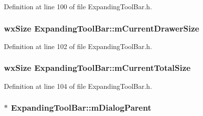 Definition at line 100 of file Expanding\+Tool\+Bar.\+h.

\subsubsection[{\texorpdfstring{m\+Current\+Drawer\+Size}{mCurrentDrawerSize}}]{\setlength{\rightskip}{0pt plus 5cm}wx\+Size Expanding\+Tool\+Bar\+::m\+Current\+Drawer\+Size\hspace{0.3cm}{\ttfamily [protected]}}\hypertarget{class_expanding_tool_bar_afc634ddc6db5c9e793250f45e8367ce4}{}\label{class_expanding_tool_bar_afc634ddc6db5c9e793250f45e8367ce4}


Definition at line 102 of file Expanding\+Tool\+Bar.\+h.

\subsubsection[{\texorpdfstring{m\+Current\+Total\+Size}{mCurrentTotalSize}}]{\setlength{\rightskip}{0pt plus 5cm}wx\+Size Expanding\+Tool\+Bar\+::m\+Current\+Total\+Size\hspace{0.3cm}{\ttfamily [protected]}}\hypertarget{class_expanding_tool_bar_af3ea6ec61447606102b1cfdc972b1c82}{}\label{class_expanding_tool_bar_af3ea6ec61447606102b1cfdc972b1c82}


Definition at line 104 of file Expanding\+Tool\+Bar.\+h.

\subsubsection[{\texorpdfstring{m\+Dialog\+Parent}{mDialogParent}}]{$\ast$ Expanding\+Tool\+Bar\+::m\+Dialog\+Parent\hspace{0.3cm}{\ttfamily [protected]}}\hypertarget{class_expanding_tool_bar_ac95afc6918352f7ab788483aed8ef677}{}\label{class_expanding_tool_bar_ac95afc6918352f7ab788483aed8ef677}



